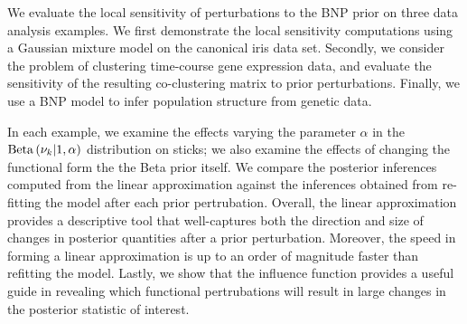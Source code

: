 We evaluate the local sensitivity of perturbations to the BNP prior on three data analysis examples.
We first demonstrate the local sensitivity computations using a Gaussian mixture model on the canonical iris data set.
Secondly, we consider the problem of clustering time-course gene expression data,
and evaluate the sensitivity of the resulting co-clustering matrix to prior perturbations.
Finally, we use a BNP model to infer population structure from genetic data.

In each example, we examine the effects varying the parameter $\alpha$
in the $\mathrm{Beta}\left(\nu_{k} \vert 1, \alpha\right)$ distribution on sticks;
we also examine the effects of changing the functional form the the Beta prior itself.
We compare the posterior inferences computed from the linear approximation against
the inferences obtained from re-fitting the model after each prior pertrubation.
Overall, the linear approximation provides a descriptive tool that well-captures both the
direction and size of changes in posterior quantities after a prior perturbation.
Moreover, the speed in forming a linear approximation is up to an order of magnitude faster than refitting the model.
Lastly, we show that the influence function provides a useful guide in revealing which
functional pertrubations will result in large changes in the posterior statistic of interest.

